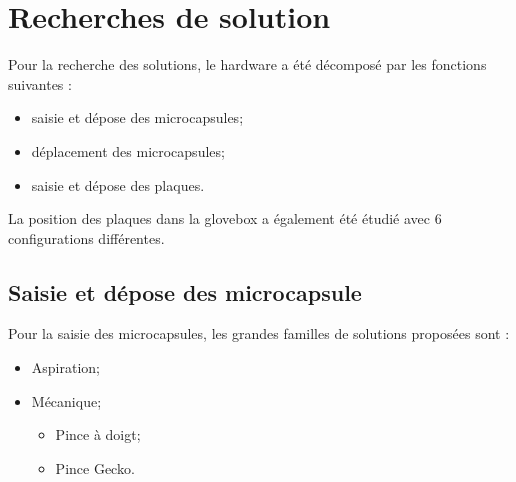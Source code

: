 \section{Recherches de solution}
Pour la recherche des solutions, le hardware a été décomposé par les fonctions suivantes : 
\begin{itemize}
    \item saisie et dépose des \glspl{microcapsule};
    \item déplacement des \glspl{microcapsule};
    \item saisie et dépose des plaques.
\end{itemize} 
La position des plaques dans la \gls{glovebox} a également été étudié avec $6$ configurations différentes.
\subsection{Saisie et dépose des microcapsule}
Pour la saisie des \glspl{microcapsule}, les grandes familles de solutions proposées sont : 
\begin{itemize}
    \item Aspiration;
    \item Mécanique; \begin{itemize}
        \item Pince à doigt;
        \item Pince Gecko.
    \end{itemize}
\end{itemize}
